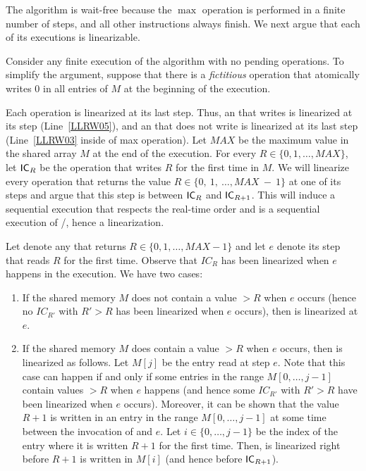 \begin{proofT}
The algorithm is wait-free because the \(\max\) operation is performed in a finite number of steps, and all other instructions always finish. We next argue that each of its executions is linearizable.

Consider any finite execution of the algorithm with no pending operations. To simplify the argument, suppose that there is a \emph{fictitious} \IC operation that atomically writes 0 in all entries of $M$ at the beginning of the execution.

Each \IC operation is linearized at its last step. Thus, an \IC that writes is linearized at its \W step (Line~\ref{LLRW05}), and an \IC that does not write is linearized at its last \R step (Line~\ref{LLRW03} inside of max operation). Let \(MAX\) be the maximum value in the shared array $M$ at the end of the execution. For every $R \in \{0,1, \hdots, MAX\}$, let ${\sf IC}_R$ be the \IC operation that writes $R$ for the first time in $M$. We will linearize every \LL operation that returns the value $R \in \{0,\ 1,\ \hdots, MAX\ -\ 1\}$ at one of its steps and argue that this step is between ${\sf IC}_R$ and ${\sf IC}_{R+1}$. This will induce a sequential execution that respects the real-time order and is a sequential execution of \LL/\IC, hence a linearization.

Let \op denote any \LL that returns $R \in \{0, 1, \hdots, MAX-1\}$ and let $e$ denote its \R step that reads $R$ for the first time. Observe that $IC_R$ has been linearized when $e$ happens in the execution. We have two cases:

\begin{enumerate}
\item If the shared memory $M$ does not contain a value $> R$ when $e$ occurs (hence no $IC_{R'}$ with $R' > R$ has been linearized when $e$ occurs), then \op is linearized at $e$.

\item If the shared memory $M$ does contain a value $> R$ when $e$ occurs, then \op is linearized as follows.  Let $M[j]$ be the entry read at step $e$. Note that this case can happen if and only if some entries in the range $M[0, \hdots, j-1]$ contain values $> R$ when $e$ happens (and hence some $IC_{R'}$ with $R' > R$ have been linearized when $e$ occurs). Moreover, it can be shown that the value $R+1$ is written in an entry in the range $M[0, \hdots, j-1]$ at some time between the invocation of \op and $e$. Let $i \in \{0, \hdots, j-1\}$ be the index of the entry where it is written $R+1$ for the first time. Then, \op is linearized right before $R+1$ is written in $M[i]$ (and hence before ${\sf IC}_{R+1}$).
\end{enumerate}
\end{proofT}



